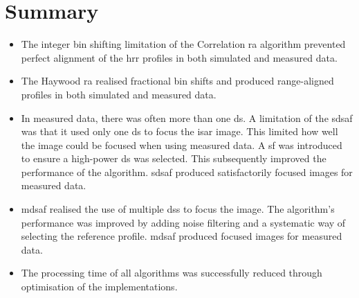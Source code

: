 \documentclass[class=report,11pt,crop=false]{standalone}
\begin{document}
\section{Summary}
\begin{itemize}
    \item The integer bin shifting limitation of the Correlation \gls{ra} algorithm prevented perfect alignment of the \gls{hrr} profiles in both simulated and measured data.
    \item The Haywood \gls{ra} realised fractional bin shifts and produced range-aligned profiles in both simulated and measured data.
    \item In measured data, there was often more than one \gls{ds}. A limitation of the \gls{sdsaf} was that it used only one \gls{ds} to focus the \gls{isar} image. This limited how well the image could be focused when using measured data. A \gls{sf} was introduced to ensure a high-power \gls{ds} was selected. This subsequently improved the performance of the algorithm. \gls{sdsaf} produced satisfactorily focused images for measured data.
    \item \gls{mdsaf} realised the use of multiple \gls{ds}s to focus the image. The algorithm's performance was improved by adding noise filtering and a systematic way of selecting the reference profile. \gls{mdsaf} produced focused images for measured data.
    \item The processing time of all algorithms was successfully reduced through optimisation of the implementations.
\end{itemize}
\ifstandalone

\printnoidxglossary[type=\acronymtype,nonumberlist]
\fi
\end{document}
